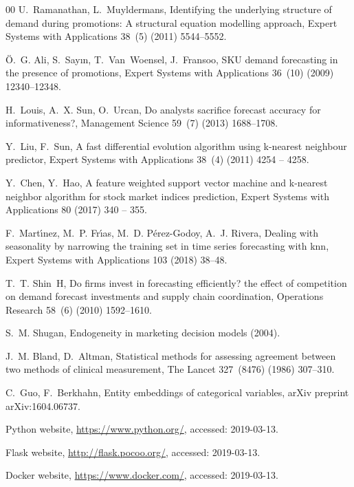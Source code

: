 \documentclass{ieeeaccess}
\begin{document}
\begin{thebibliography}{00}
U.~Ramanathan, L.~Muyldermans, Identifying the underlying structure of demand
  during promotions: A structural equation modelling approach, Expert Systems
  with Applications 38~(5) (2011) 5544--5552.

{\"O}.~G. Ali, S.~Say{\i}n, T.~Van~Woensel, J.~Fransoo, {SKU} demand
  forecasting in the presence of promotions, Expert Systems with Applications
  36~(10) (2009) 12340--12348.

H.~Louis, A.~X. Sun, O.~Urcan, Do analysts sacrifice forecast accuracy for
  informativeness?, Management Science 59~(7) (2013) 1688--1708.

Y.~Liu, F.~Sun, A fast differential evolution algorithm using k-nearest
  neighbour predictor, Expert Systems with Applications 38~(4) (2011) 4254 --
  4258.

Y.~Chen, Y.~Hao, A feature weighted support vector machine and k-nearest
  neighbor algorithm for stock market indices prediction, Expert Systems with
  Applications 80 (2017) 340 -- 355.

F.~Mart{\'\i}nez, M.~P. Fr{\'\i}as, M.~D. P{\'e}rez-Godoy, A.~J. Rivera,
  Dealing with seasonality by narrowing the training set in time series
  forecasting with knn, Expert Systems with Applications 103 (2018) 38--48.

T.~T. Shin~H, Do firms invest in forecasting efficiently? the effect of
  competition on demand forecast investments and supply chain coordination,
  Operations Research 58~(6) (2010) 1592--1610.

S.~M. Shugan, Endogeneity in marketing decision models (2004).

J.~M. Bland, D.~Altman, Statistical methods for assessing agreement between two
  methods of clinical measurement, The Lancet 327~(8476) (1986) 307--310.

C.~Guo, F.~Berkhahn, Entity embeddings of categorical variables, arXiv preprint
  arXiv:1604.06737.

Python website, \url{https://www.python.org/}, accessed: 2019-03-13.

Flask website, \url{http://flask.pocoo.org/}, accessed: 2019-03-13.

Docker website, \url{https://www.docker.com/}, accessed: 2019-03-13.


\end{thebibliography}
\end{document}
